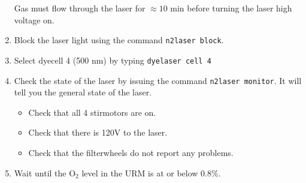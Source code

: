 \documentclass[11pt]{article}
\begin{document}
\begin{enumerate}
Gas must flow through the laser for $\approx 10$ min before turning the laser high voltage on.
\item \CheckBox[name=rluo25]{} Block the laser light using the command \verb+n2laser block+.
\item \CheckBox[name=rluo26]{} Select dyecell 4 (500 nm) by typing \verb+dyelaser cell 4+
\item \CheckBox[name=rluo27]{} Check the state of the laser by issuing the command \verb+n2laser monitor+. It will tell you the general state of the laser. 
	\begin{itemize}
	\item \CheckBox[name=lst1]{} Check that all 4 stirmotors are on.
	\item \CheckBox[name=lst2]{} Check that there is 120V to the laser.
	\item \CheckBox[name=lst3]{} Check that the filterwheels do not report any problems.
	\end{itemize}
\item {} Wait until the O$_2$ level in the URM is at or below 0.8\%.

\end{enumerate}
\end{document}
